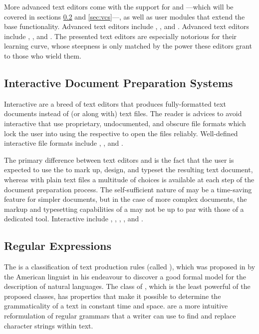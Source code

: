 \documentclass[a5paper,10pt]{book}
\begin{document}
More advanced text editors come with the support for 
and ---which will be covered in sections \ref{sec:regexs}
and \ref{sec:vcs}---, as well as user modules that extend the base
functionality.  Advanced  text editors include ,
, and . Advanced  text editors include
, , and . The presented 
text editors are especially notorious for their learning curve, whose steepness
is only matched by the power these editors grant to those who wield them.

\subsection{Interactive Document Preparation Systems}
Interactive  are a breed of text
editors that produces fully-formatted text documents instead of (or along with)
text files. The reader is advices to avoid interactive  that use
proprietary, undocumented, and obscure file formats which lock the user into
using the respective  to open the files reliably. Well-defined
interactive  file formats include , ,
and .

The primary difference between text editors and  is the fact that
the user is expected to use the  to mark up, design, and typeset the
resulting text document, whereas with plain text files a multitude of choices is
available at each step of the document preparation process. The self-sufficient
nature of  may be a time-saving feature for simpler documents, but
in the case of more complex documents, the markup and typesetting capabilities
of a  may not be up to par with those of a dedicated tool.
Interactive  include , ,
, , and .

\subsection{Regular Expressions}\label{sec:regexs}
The  is a classification of text production rules
(called ), which was proposed \cite{chomsky56} in
\citeyear{chomsky56} by the American linguist  in his
endeavour to discover a good formal model for the description of natural
languages. The class of , which is the least powerful
of the proposed classes, has properties that make it possible to determine the
grammaticality of a text in constant time and space.  are a more intuitive reformulation of regular grammars that a writer
can use to find and replace character strings within text.
\end{document}
